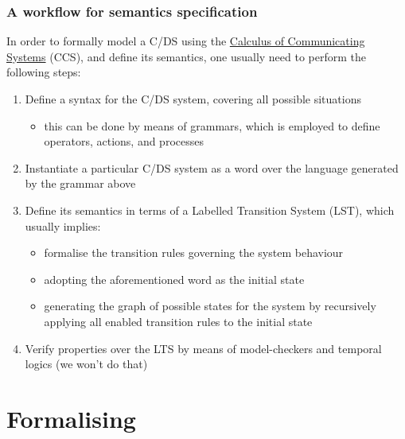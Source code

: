 \documentclass[presentation]{beamer}\mode<presentation>{\usetheme{AMSCesenaPurpleAndGold}}
\begin{document}
\begin{frame}
\frametitle{A workflow for semantics specification}
    
    In order to \alert{formally} model a C/DS using the \href{https://en.wikipedia.org/wiki/Calculus_of_communicating_systems}{Calculus of Communicating Systems} (CCS), and define its semantics, one usually need to perform the following steps:
    \begin{enumerate}
        \item<1> Define a \alert{syntax} for the C/DS system, covering all possible situations
        \begin{itemize}
            \item<1> this can be done by means of \alert{grammars}, which is employed to define operators, actions, and processes
        \end{itemize}
        
        \item<2> Instantiate a particular C/DS system as a \alert{word} over the language generated by the grammar above
        
        \item<3> Define its semantics in terms of a \alert{Labelled Transition System} (LST), which usually implies:
        \begin{itemize}
            \item<3> formalise the \alert{transition rules} governing the system behaviour
            \item<3> adopting the aforementioned word as the \alert{initial state}
            
            \item<3> generating the graph of possible states for the system by recursively applying all enabled transition rules to the initial state
        \end{itemize}
        
        \item<4> Verify properties over the LTS by means of \alert{model-checkers} and \alert{temporal logics} (we won't do that) 
    \end{enumerate}
    
\end{frame}


\section{Formalising \linda{}}
\end{document}
